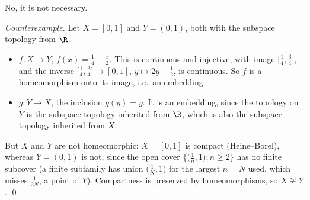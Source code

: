 
No, it is not necessary.

\emph{Counterexample.} Let $X=[0,1]$ and $Y=(0,1)$, both with the subspace topology from $\R$.
\begin{itemize}
  \item $f\colon X\to Y$, $f(x)=\frac14+\frac{x}{2}$. This is continuous and injective, with image
        $\bigl[\frac14,\frac34\bigr]$, and the inverse
        $\bigl[\frac14,\frac34\bigr]\to[0,1]$, $y\mapsto 2y-\frac12$, is continuous. So $f$ is a
        homeomorphism onto its image, i.e.\ an embedding.
  \item $g\colon Y\to X$, the inclusion $g(y)=y$. It is an embedding, since the topology on $Y$ is
        the subspace topology inherited from $\R$, which is also the subspace topology inherited
        from $X$.
\end{itemize}
But $X$ and $Y$ are not homeomorphic: $X=[0,1]$ is compact (Heine--Borel), whereas $Y=(0,1)$ is
not, since the open cover $\bigl\{\bigl(\frac1n,1\bigr) : n\ge 2\bigr\}$ has no finite subcover
(a finite subfamily has union $\bigl(\frac1N,1\bigr)$ for the largest $n=N$ used, which misses
$\frac{1}{2N}$, a point of $Y$). Compactness is preserved by homeomorphisms, so
$X\not\cong Y$. \qed
